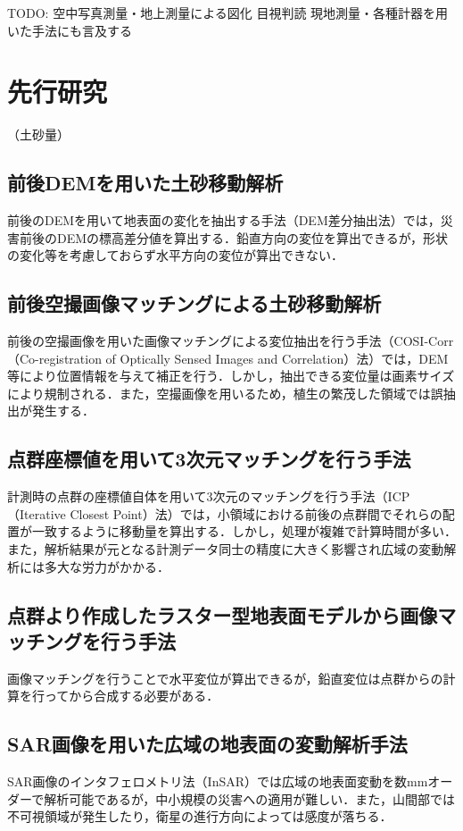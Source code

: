     TODO: 
    空中写真測量・地上測量による図化
    目視判読
    現地測量・各種計器を用いた手法にも言及する

  \section{先行研究}
（土砂量）


    \subsection{前後DEMを用いた土砂移動解析}
      前後のDEMを用いて地表面の変化を抽出する手法（DEM差分抽出法）では，災害前後のDEMの標高差分値を算出する．鉛直方向の変位を算出できるが，形状の変化等を考慮しておらず水平方向の変位が算出できない．

    \subsection{前後空撮画像マッチングによる土砂移動解析}
      前後の空撮画像を用いた画像マッチングによる変位抽出を行う手法（COSI-Corr（Co-registration of Optically Sensed Images and Correlation）法）では，DEM等により位置情報を与えて補正を行う．しかし，抽出できる変位量は画素サイズにより規制される．また，空撮画像を用いるため，植生の繁茂した領域では誤抽出が発生する．

    \subsection{点群座標値を用いて3次元マッチングを行う手法}
      計測時の点群の座標値自体を用いて3次元のマッチングを行う手法（ICP（Iterative Closest Point）法）では，小領域における前後の点群間でそれらの配置が一致するように移動量を算出する．しかし，処理が複雑で計算時間が多い．また，解析結果が元となる計測データ同士の精度に大きく影響され広域の変動解析には多大な労力がかかる．

    \subsection{点群より作成したラスター型地表面モデルから画像マッチングを行う手法}
      画像マッチングを行うことで水平変位が算出できるが，鉛直変位は点群からの計算を行ってから合成する必要がある．

    \subsection{SAR画像を用いた広域の地表面の変動解析手法}
      SAR画像のインタフェロメトリ法（InSAR）では広域の地表面変動を数mmオーダーで解析可能であるが，中小規模の災害への適用が難しい．また，山間部では不可視領域が発生したり，衛星の進行方向によっては感度が落ちる．

